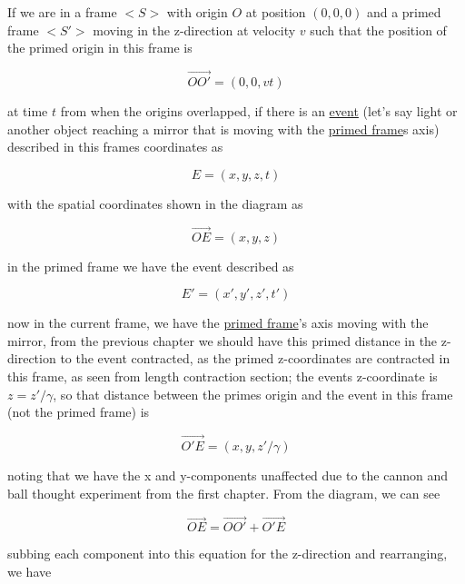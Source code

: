 If we are in a frame $<\!\!S\!>$ with origin $O$ at position $(0,0,0)$ and a primed frame $<\!\!S'\!\!>$ moving in the z-direction at velocity $v$ such that the position of the primed origin in this frame is

\begin{equation}
	\vec{OO'}=(0,0,vt)
\end{equation}

at time $t$ from when the origins overlapped, if there is an \hyperlink{def-event}{event} (let's say light or another object reaching a mirror that is moving with the \hyperlink{def-Primed-Frame}{primed frame}s axis) described in this frames coordinates as

\begin{equation}
	E = (x,y,z,t)
\end{equation}

with the spatial coordinates shown in the diagram as

\begin{equation}
	\vec{OE}=(x,y,z)
\end{equation}

in the primed frame we have the event described as

\begin{equation}
	E' = (x',y',z',t')
\end{equation}

now in the current frame, we have the \hyperlink{def-Primed-Frame}{primed frame}'s axis moving with the mirror, from the previous chapter we should have this primed distance in the z-direction to the event contracted, as the primed z-coordinates are contracted in this frame, as seen from length contraction section; the events z-coordinate is $z=z'/{\gamma}$, so that distance between the primes origin and the event in this frame (not the primed frame) is

\begin{equation}
	\vec{O'E} = (x,y,z'/{\gamma})
\end{equation}

noting that we have the x and y-components unaffected due to the cannon and ball thought experiment from the first chapter. From the diagram, we can see

\begin{equation}
	\vec{OE}= \vec{OO'} + \vec{O'E}
	\label{eq: event}
\end{equation}

subbing each component into this equation for the z-direction and rearranging, we have

